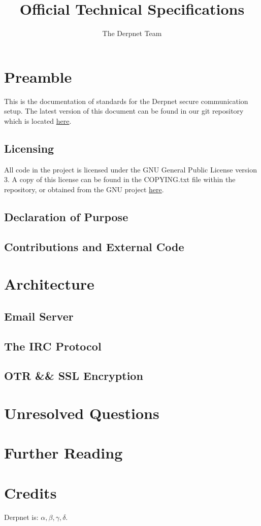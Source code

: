 \documentclass[11pt]{article}
\title{Official Technical Specifications}
\author{The Derpnet Team}
\begin{document}
\maketitle

\section{Preamble}

This is the documentation of standards for the Derpnet secure communication
setup.  The latest version of this document can be found in our git
repository which is located \href{https://github.com/BUILDS-/Derpnet}{here}.

\subsection{Licensing}

All code in the project is licensed under the GNU General Public License
version 3.  A copy of this license can be found in the COPYING.txt file
within the repository, or obtained from the GNU project
\href{http://www.gnu.org/licenses/gpl.txt}{here}. 

\subsection{Declaration of Purpose}

\subsection{Contributions and External Code}

\section{Architecture}

\subsection{Email Server}

\subsection{The IRC Protocol}

\subsection{OTR \&\& SSL Encryption}

\section{Unresolved Questions}

\section{Further Reading}

\section{Credits}

Derpnet is: $\alpha, \beta, \gamma, \delta$.
\end{document}

